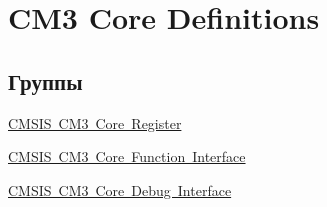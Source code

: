 \hypertarget{group___c_m_s_i_s___c_m3__core__definitions}{}\section{C\+M3 Core Definitions}
\label{group___c_m_s_i_s___c_m3__core__definitions}
\subsection*{Группы}
\begin{DoxyCompactItemize}
\item 
\mbox{\hyperlink{group___c_m_s_i_s___c_m3__core__register}{C\+M\+S\+I\+S C\+M3 Core Register}}
\item 
\mbox{\hyperlink{group___c_m_s_i_s___c_m3___core___function_interface}{C\+M\+S\+I\+S C\+M3 Core Function Interface}}
\item 
\mbox{\hyperlink{group___c_m_s_i_s___c_m3___core_debug_interface}{C\+M\+S\+I\+S C\+M3 Core Debug Interface}}
\end{DoxyCompactItemize}
